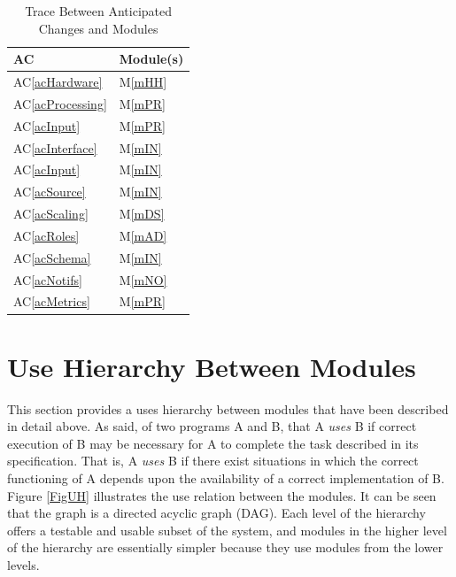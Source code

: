 \documentclass[12pt, titlepage]{article}
\newcommand{\acref}[1]{AC\ref{#1}}
\newcommand{\mref}[1]{M\ref{#1}}
\begin{document}
\begin{description}
\begin{description}
\begin{table}[H]
\centering
\begin{tabular}{p{} p{}}
\toprule
\textbf{AC} & \textbf{Module(s)}\\
\midrule
\acref{acHardware} & \mref{mHH}\\
\acref{acProcessing} & \mref{mPR}\\
\acref{acInput} & \mref{mPR}\\
\acref{acInterface} & \mref{mIN}\\
\acref{acInput} & \mref{mIN}\\
\acref{acSource} & \mref{mIN}\\
\acref{acScaling} & \mref{mDS}\\
\acref{acRoles} & \mref{mAD}\\
\acref{acSchema} & \mref{mIN}\\
\acref{acNotifs} & \mref{mNO}\\
\acref{acMetrics} & \mref{mPR}\\
\bottomrule
\end{tabular}
\caption{Trace Between Anticipated Changes and Modules}
\label{TblACT}
\end{table}

\section{Use Hierarchy Between Modules} \label{SecUse}
This section provides a uses hierarchy between modules that have been described in detail 
above. As \citet{Parnas1978} said, of two programs A and B, that A {\em uses} B if correct 
execution of B may be necessary for A to complete the task described in its specification.
That is, A {\em uses} B if there exist situations in which the correct functioning of A 
depends upon the availability of a correct implementation of B.\\
\newline
Figure \ref{FigUH} illustrates the use relation between the modules. It can be seen that 
the graph is a directed acyclic graph (DAG). Each level of the hierarchy offers a testable
and usable subset of the system, and modules in the higher level of the hierarchy are 
essentially simpler because they use modules from the lower levels.


\end{description}
\end{description}
\end{document}
